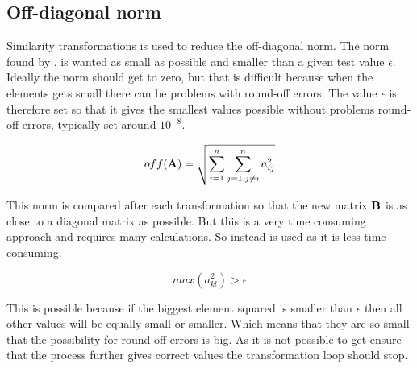 

\subsection*{Off-diagonal norm}

Similarity transformations is used to reduce the off-diagonal norm. The norm found by , is wanted as small as possible and smaller than a given test value $\epsilon $. Ideally the norm should get to zero, but that is difficult because when the elements gets small there can be problems with round-off errors. The value $\epsilon $ is therefore set so that it gives the smallest values possible without problems round-off errors, typically set around $10^{-8}$.  

\begin{equation}
	off(\mbox{\textbf{A}}) = \sqrt{\sum_{i=1}^n\sum_{j=1,j \ne i}^n a_{ij}^2}
	\label{eq:normA}
\end{equation} 


This norm is compared after each transformation so that the new matrix $\mbox{\textbf{B}}$ is as close to a diagonal matrix as possible. But this is a very time consuming approach and requires many calculations. So instead  is used as it is less time consuming. 

\begin{equation}
	max(a_{kl}^2) > \epsilon
	\label{eq:maxa}
\end{equation}

This is possible because if the biggest element squared is smaller than $\epsilon$ then all other values will be equally small or smaller. Which means that they are so small that the possibility for round-off errors is big. As it is not possible to get ensure that the process further gives correct values the transformation loop should stop. 







